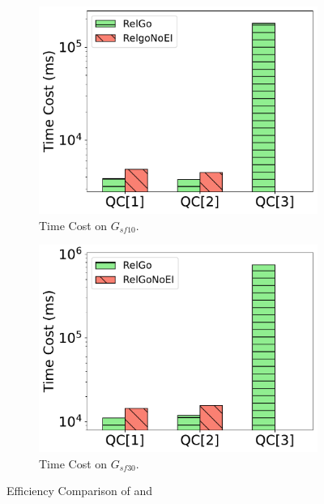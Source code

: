 \begin{figure}[ht]
    \centering
    \begin{subfigure}[b]{.45\linewidth}
        \centering
        \includegraphics[width=\linewidth]{./figures/exp/ablation_ei_sf10.pdf}
        \caption{Time Cost on $G_{sf10}$.}
        \label{fig:exp-expand-intersect-sf10}
    \end{subfigure}
    \begin{subfigure}[b]{0.45\linewidth}
        \centering
        \includegraphics[width=\linewidth]{./figures/exp/ablation_ei_sf30.pdf}
        \caption{Time Cost on $G_{sf30}$.}
        \label{fig:exp-expand-intersect-sf30}
    \end{subfigure}
    \caption{Efficiency Comparison of \name and \relgomj}
    \label{fig:exp-expand-intersect}
\end{figure}

